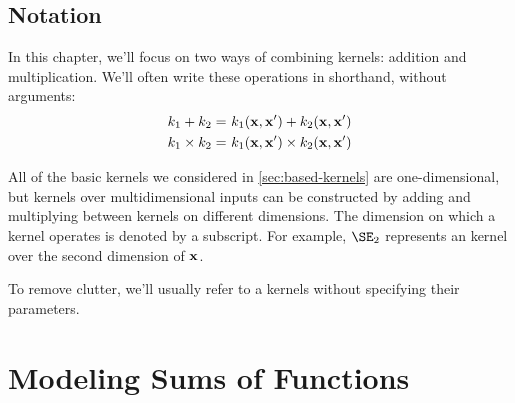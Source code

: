 


\subsection{Notation}

In this chapter, we'll focus on two ways of combining kernels: addition and multiplication.
We'll often write these operations in shorthand, without arguments:
%
\begin{align}
k_1 + k_2 =& \,\, k_1({\bf{x}}, {\bf{x}}') + k_2( {\bf{x}}, {\bf{x}}')\\
k_1 \times k_2 =& \,\, k_1({\bf{x}}, {\bf{x}}') \times k_2({\bf{x}}, {\bf{x}}')
\end{align}

All of the basic kernels we considered in \cref{sec:based-kernels} are one-dimensional, but kernels over multidimensional inputs can be constructed by adding and multiplying between kernels on different dimensions.
The dimension on which a kernel operates is denoted by a subscript.
For example, $\SE_2$ represents an \kSE{} kernel over the second dimension of ${\bf{x}}$.

To remove clutter, we'll usually refer to a kernels without specifying their parameters.



\section{Modeling Sums of Functions}

